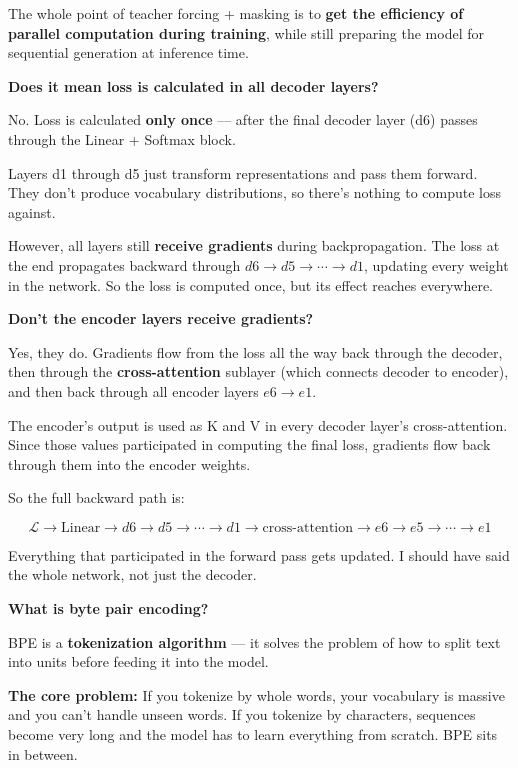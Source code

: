 The whole point of teacher forcing + masking is to \textbf{get the efficiency of parallel computation during training}, while still preparing the model for sequential generation at inference time.

\bigskip

\textbf{Does it mean loss is calculated in all decoder layers?}

No. Loss is calculated \textbf{only once} --- after the final decoder layer (d6) passes through the Linear + Softmax block.

Layers d1 through d5 just transform representations and pass them forward. They don't produce vocabulary distributions, so there's nothing to compute loss against.

However, all layers still \textbf{receive gradients} during backpropagation. The loss at the end propagates backward through $d6 \to d5 \to \cdots \to d1$, updating every weight in the network. So the loss is computed once, but its effect reaches everywhere.

\bigskip

\textbf{Don't the encoder layers receive gradients?}

Yes, they do. Gradients flow from the loss all the way back through the decoder, then through the \textbf{cross-attention} sublayer (which connects decoder to encoder), and then back through all encoder layers $e6 \to e1$.

The encoder's output is used as K and V in every decoder layer's cross-attention. Since those values participated in computing the final loss, gradients flow back through them into the encoder weights.

So the full backward path is:

\[
\mathcal{L} \rightarrow \text{Linear} \rightarrow d6 \rightarrow d5 \rightarrow \cdots \rightarrow d1 \rightarrow \text{cross-attention} \rightarrow e6 \rightarrow e5 \rightarrow \cdots \rightarrow e1
\]

Everything that participated in the forward pass gets updated. I should have said the whole network, not just the decoder.

\bigskip

\textbf{What is byte pair encoding?}

BPE is a \textbf{tokenization algorithm} --- it solves the problem of how to split text into units before feeding it into the model.

\noindent\textbf{The core problem:} If you tokenize by whole words, your vocabulary is massive and you can't handle unseen words. If you tokenize by characters, sequences become very long and the model has to learn everything from scratch. BPE sits in between.

